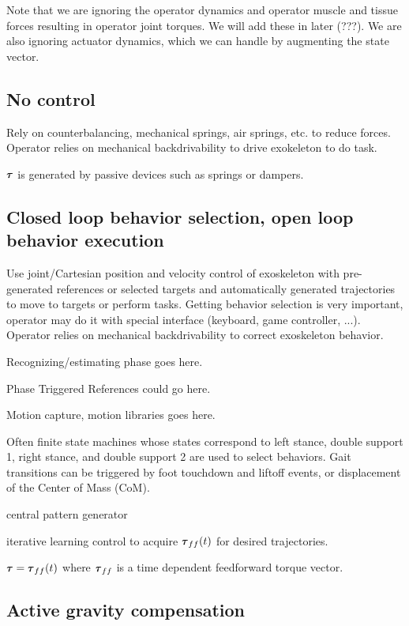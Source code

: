 \documentclass[letterpaper,12pt,fullpage]{article}
\begin{document}
Note that we are ignoring the operator dynamics and operator muscle and tissue
forces resulting in operator joint torques. We will add these in later (???).
We are also ignoring actuator dynamics, which we can handle by augmenting 
the state vector.

\subsection{No control}

Rely on counterbalancing, mechanical springs, air springs, etc.
to reduce forces. 
Operator relies on mechanical backdrivability to drive
exokeleton to do task.

$\vtau$ is generated by passive devices such as springs or dampers.

\subsection{Closed loop behavior selection, open loop behavior
execution}

Use joint/Cartesian position and velocity control of exoskeleton 
with pre-generated references or selected targets and automatically generated trajectories to move to targets or perform tasks.
Getting behavior selection is very important, operator may do it with
special interface (keyboard, game controller, ...).
Operator relies on mechanical backdrivability to correct exoskeleton behavior.

Recognizing/estimating phase goes here.

Phase Triggered References could go here.

Motion capture, motion libraries goes here.

Often finite state machines whose states correspond to left stance, double support 1,
right stance, and double support 2 are used to select behaviors. Gait transitions
can be triggered by foot touchdown and liftoff events, or
displacement of the Center of Mass (CoM).

central pattern generator

iterative learning control to acquire $\vtau_{ff}(t)$ for desired trajectories.

$\vtau = \vtau_{ff}(t)$ where $\vtau_{ff}$ is a time
dependent feedforward torque vector.

\subsection{Active gravity compensation}
\end{document}
